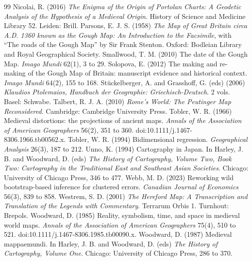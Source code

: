 \documentclass[11pt,a4paper]{article}
\begin{document}
\begin{thebibliography}{99}
 Nicolai, R. (2016) \textit{The Enigma of the Origin of Portolan Charts: A Geodetic Analysis of the Hypothesis of a Medieval Origin}. History of Science and Medicine Library 52. Leiden: Brill.
 Parsons, E. J. S. (1958) \textit{The Map of Great Britain circa A.D. 1360 known as the Gough Map: An Introduction to the Facsimile}, with ``The roads of the Gough Map'' by Sir Frank Stenton. Oxford: Bodleian Library and Royal Geographical Society.
 Smallwood, T. M. (2010) The date of the Gough Map. \textit{Imago Mundi} 62(1), 3 to 29.
 Solopova, E. (2012) The making and re-making of the Gough Map of Britain: manuscript evidence and historical context. \textit{Imago Mundi} 64(2), 155 to 168.
 St\"uckelberger, A. and Grasshoff, G. (eds) (2006) \textit{Klaudios Ptolemaios, Handbuch der Geographie: Griechisch-Deutsch}. 2 vols. Basel: Schwabe.
 Talbert, R. J. A. (2010) \textit{Rome's World: The Peutinger Map Reconsidered}. Cambridge: Cambridge University Press.
 Tobler, W. R. (1966) Medieval distortions: the projections of ancient maps. \textit{Annals of the Association of American Geographers} 56(2), 351 to 360. doi:10.1111/j.1467-8306.1966.tb00562.x.
 Tobler, W. R. (1994) Bidimensional regression. \textit{Geographical Analysis} 26(3), 187 to 212.
 Unno, K. (1994) Cartography in Japan. In Harley, J. B. and Woodward, D. (eds) \textit{The History of Cartography, Volume Two, Book Two: Cartography in the Traditional East and Southeast Asian Societies}. Chicago: University of Chicago Press, 346 to 477.
 Webb, M. D. (2023) Reworking wild bootstrap-based inference for clustered errors. \textit{Canadian Journal of Economics} 56(3), 839 to 858.
 Westrem, S. D. (2001) \textit{The Hereford Map: A Transcription and Translation of the Legends with Commentary}. Terrarum Orbis 1. Turnhout: Brepols.
 Woodward, D. (1985) Reality, symbolism, time, and space in medieval world maps. \textit{Annals of the Association of American Geographers} 75(4), 510 to 521. doi:10.1111/j.1467-8306.1985.tb00090.x.
 Woodward, D. (1987) Medieval mappaemundi. In Harley, J. B. and Woodward, D. (eds) \textit{The History of Cartography, Volume One}. Chicago: University of Chicago Press, 286 to 370.
\end{thebibliography}
\end{document}
